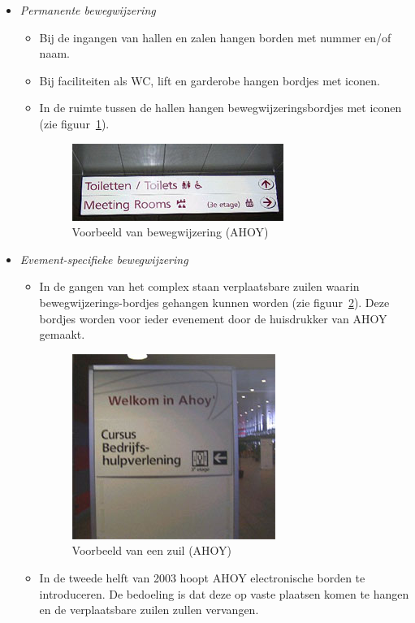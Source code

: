 \begin{itemize}

\item \emph{Permanente bewegwijzering}

\begin{itemize}
\item Bij de ingangen van hallen en zalen hangen borden met nummer en/of naam.
\item Bij faciliteiten als WC, lift en garderobe hangen bordjes met iconen.
\item In de ruimte tussen de hallen hangen bewegwijzeringsbordjes met iconen (zie figuur~\ref{figuur:ahoy_borden}).

\begin{figure}
\begin{center}
\includegraphics{images/ahoy_borden.jpg}
\end{center}
\caption{Voorbeeld van bewegwijzering (AHOY)}
\label{figuur:ahoy_borden}
\end{figure}

\end{itemize}

\item \emph{Evement-specifieke bewegwijzering}

\begin{itemize}
\item In de gangen van het complex staan verplaatsbare zuilen waarin bewegwijzerings-bordjes gehangen kunnen worden (zie figuur~\ref{figuur:ahoy_zuil}). Deze bordjes worden voor ieder evenement door de huisdrukker van AHOY gemaakt.

\begin{figure}
\begin{center}
\includegraphics{images/ahoy_zuil.jpg}
\end{center}
\caption{Voorbeeld van een zuil (AHOY)}
\label{figuur:ahoy_zuil}
\end{figure}

\item In de tweede helft van 2003 hoopt AHOY electronische borden te introduceren. De bedoeling is dat deze op vaste plaatsen komen te hangen en de verplaatsbare zuilen zullen vervangen.
\end{itemize}

\end{itemize}


